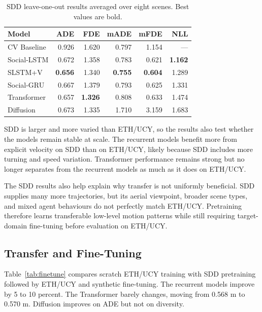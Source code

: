 \documentclass[conference]{IEEEtran}
\begin{document}
\begin{table}[t]
\caption{SDD leave-one-out results averaged over eight scenes. Best values are bold.}
\label{tab:sdd}
\centering
\footnotesize
\setlength{\tabcolsep}{3.5pt}
\begin{tabular}{@{}lrrrrr@{}}
\toprule
Model & ADE & FDE & mADE & mFDE & NLL \\
\midrule
CV Baseline & 0.926 & 1.620 & 0.797 & 1.154 & --- \\
Social-LSTM & 0.672 & 1.358 & 0.783 & 0.621 & \textbf{1.162} \\
SLSTM+V & \textbf{0.656} & 1.340 & \textbf{0.755} & \textbf{0.604} & 1.289 \\
Social-GRU & 0.667 & 1.379 & 0.793 & 0.625 & 1.331 \\
Transformer & 0.657 & \textbf{1.326} & 0.808 & 0.633 & 1.474 \\
Diffusion & 0.673 & 1.335 & 1.710 & 3.159 & 1.683 \\
\bottomrule
\end{tabular}
\end{table}

SDD is larger and more varied than ETH/UCY, so the results also test whether
the models remain stable at scale. The recurrent models benefit more from
explicit velocity on SDD than on ETH/UCY, likely because SDD includes more
turning and speed variation. Transformer performance remains strong but no
longer separates from the recurrent models as much as it does on ETH/UCY.

The SDD results also help explain why transfer is not uniformly beneficial.
SDD supplies many more trajectories, but its aerial viewpoint, broader scene
types, and mixed agent behaviours do not perfectly match ETH/UCY. Pretraining
therefore learns transferable low-level motion patterns while still requiring
target-domain fine-tuning before evaluation on ETH/UCY.

\subsection{Transfer and Fine-Tuning}

Table~\ref{tab:finetune} compares scratch ETH/UCY training with SDD pretraining
followed by ETH/UCY and synthetic fine-tuning. The recurrent models improve by
5 to 10 percent. The Transformer barely changes, moving from 0.568 m to 0.570
m. Diffusion improves on ADE but not on diversity.
\end{document}
